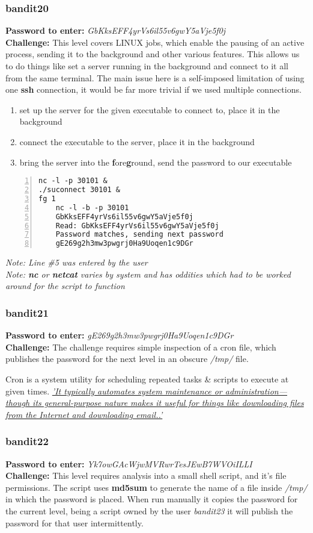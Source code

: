 \documentclass[a4paper]{article}
\newcommand{\pass}[1]{\textbf{Password to enter:} \textit{#1}\\}
\newcommand{\chall}{\textbf{Challenge:} }
\begin{document}
\subsubsection{bandit20}
\pass{GbKksEFF4yrVs6il55v6gwY5aVje5f0j}
\chall This level covers LINUX jobs, which enable the pausing of an active process, sending it to the background and other various features. This allows us to do things like set a server running in the background and connect to it all from the same terminal. The main issue here is a self-imposed limitation of using one \textbf{ssh} connection, it would be far more trivial if we used multiple connections.
\begin{enumerate}
	\item set up the server for the given executable to connect to, place it in the background
	\item connect the executable to the server, place it in the background
	\item bring the server into the \textbf{f}ore\textbf{g}round, send the password to our executable
\end{enumerate}
\begin{lstlisting}[numbers=left]
nc -l -p 30101 &
./suconnect 30101 &
fg 1
	nc -l -b -p 30101
	GbKksEFF4yrVs6il55v6gwY5aVje5f0j
	Read: GbKksEFF4yrVs6il55v6gwY5aVje5f0j
	Password matches, sending next password
	gE269g2h3mw3pwgrj0Ha9Uoqen1c9DGr
\end{lstlisting}
\textit{Note: Line \#5 was entered by the user}\\
\textit{Note: \textbf{nc} or \textbf{netcat} varies by system and has oddities which had to be worked around for the script to function}

\subsubsection{bandit21}
\pass{gE269g2h3mw3pwgrj0Ha9Uoqen1c9DGr}
\chall The challenge requires simple inspection of a cron file, which publishes the password for the next level in an obscure \textit{/tmp/} file.

Cron is a system utility for scheduling repeated tasks \& scripts to execute at given times. \href{https://en.wikipedia.org/wiki/Cron}{\textit{'It typically automates system maintenance or administration—though its general-purpose nature makes it useful for things like downloading files from the Internet and downloading email..'}}

\subsubsection{bandit22}
\pass{Yk7owGAcWjwMVRwrTesJEwB7WVOiILLI}
\chall This level requires analysis into a small shell script, and it's file permissions. The script uses \textbf{md5sum} to generate the name of a file inside \textit{/tmp/} in which the password is placed. When run manually it copies the password for the current level, being a script owned by the user \textit{bandit23} it will publish the password for that user intermittently.
\end{document}
